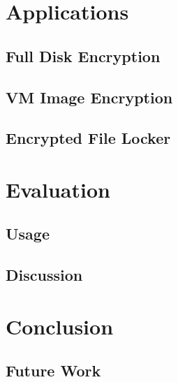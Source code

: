 \documentclass[letterpaper,twocolumn,10pt]{article}
\begin{document}



\section{Applications}
\label{sec:apps}

\subsection{Full Disk Encryption}

\subsection{VM Image Encryption}

\subsection{Encrypted File Locker}

\section{Evaluation}
\label{sec:eval}

\subsection{Usage}

\subsection{Discussion}

\section{Conclusion}
\label{sec:conclusion}

\subsection{Future Work}


{
  \footnotesize
  
  
}
\end{document}
